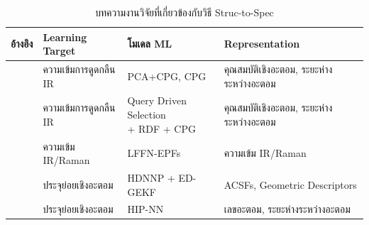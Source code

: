 \begin{table}[H]
    \centering
    \caption{บทความงานวิจัยที่เกี่ยวข้องกับวิธี Struc-to-Spec}
    \label{tab:struc2spec}
    \small
    \begin{tabular}{clll}
        \toprule
        \textbf{อ้างอิง}                   & \textbf{Learning Target}                           & \textbf{โมเดล ML}                                            & \textbf{Representation} \\
        \midrule
        \autocite{schuur1996,Schuur1997} & ความเข้มการดูดกลืน IR                                 & PCA+CPG\autocite{hecht-nielsen1987},
        CPG\autocite{hecht-nielsen1987}  & คุณสมบัติเชิงอะตอม, ระยะห่างระหว่างอะตอม                                                                                                          \\

        \autocite{selzer2000,kostka2001} & ความเข้มการดูดกลืน IR                                 & \makecell[tl]{Query Driven Selection                                                   \\ + RDF +
        CPG\autocite{hecht-nielsen1987}} & คุณสมบัติเชิงอะตอม, ระยะห่างระหว่างอะตอม                                                                                                          \\

        \autocite{yildiz2011,yildiz2012} & ความเข้ม IR/Raman                                   & LFFN-EPFs\autocite{yildiz2011}                               & ความเข้ม IR/Raman        \\

        \autocite{gastegger2017}         & ประจุย่อยเชิงอะตอม                                    & HDNNP\autocite{behler2007} + ED-GEKF\autocite{gastegger2015}
                                         & ACSFs\autocite{behler2011a}, Geometric Descriptors                                                                                          \\

        \autocite{sifain2018,nebgen2018} & ประจุย่อยเชิงอะตอม                                    & HIP-NN\autocite{lubbers2018}                                 & เลขอะตอม,
        ระยะห่างระหว่างอะตอม                                                                                                                                                             \\
        \bottomrule
    \end{tabular}
\end{table}


